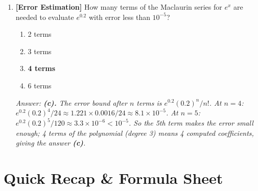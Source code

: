 \documentclass[12pt,a4paper]{article}
\begin{document}
\begin{enumerate}[leftmargin=2em, label=\textbf{Q\arabic*.}]
\item \textbf{[Error Estimation]} How many terms of the Maclaurin series for \(e^x\) are needed
to evaluate \(e^{0.2}\) with error less than \(10^{-5}\)?
\begin{enumerate}[label=(\alph*)]
  \item 2 terms
  \item 3 terms
  \item \textbf{4 terms}
  \item 6 terms
\end{enumerate}
\textit{Answer: \textbf{(c).} The error bound after \(n\) terms is
\(e^{0.2}(0.2)^n / n!\).
At \(n=4\): \(e^{0.2}(0.2)^4/24 \approx 1.221 \times 0.0016/24 \approx 8.1\times10^{-5}\).
At \(n=5\): \(e^{0.2}(0.2)^5/120 \approx 3.3\times10^{-6} < 10^{-5}\).
So the 5th term makes the error small enough; 4 terms of the polynomial (degree 3)
means 4 computed coefficients, giving the answer \textbf{(c)}.}

\end{enumerate}

\section{Quick Recap \& Formula Sheet}
\end{document}

